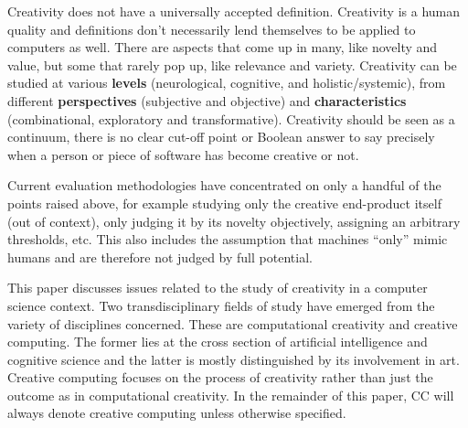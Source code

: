 Creativity does not have a universally accepted definition. Creativity is a human quality and definitions don’t necessarily lend themselves to be applied to computers as well. There are aspects that come up in many, like novelty and value, but some that rarely pop up, like relevance and variety. Creativity can be studied at various \textbf{levels} (neurological, cognitive, and holistic/systemic), from different \textbf{perspectives} (subjective and objective) and \textbf{characteristics} (combinational, exploratory and transformative). Creativity should be seen as a continuum, there is no clear cut-off point or Boolean answer to say precisely when a person or piece of software has become creative or not.

Current evaluation methodologies have concentrated on only a handful of the points raised above, for example studying only the creative end-product itself (out of context), only judging it by its novelty objectively, assigning an arbitrary thresholds, etc. This also includes the assumption that machines ``only'' mimic humans and are therefore not judged by full potential.

\begin{comment}
  What does it mean, how can it be measured?

  Subjectivity vs objectivity is a theme throughout

  How is it defined and measured in humans, what can we just take directly from those concepts and apply them directly to machines and what needs to be completely redefined?
\end{comment}

This paper discusses issues related to the study of creativity in a computer science context. Two transdisciplinary fields of study have emerged from the variety of disciplines concerned. These are computational creativity and creative computing. The former lies at the cross section of artificial intelligence and cognitive science and the latter is mostly distinguished by its involvement in art. Creative computing focuses on the process of creativity rather than just the outcome as in computational creativity. In the remainder of this paper, CC will always denote creative computing unless otherwise specified.

\begin{comment}
  Many of these (if not all) spawn from the computational creativity discipline.

  Introduce the difference between human and computer evaluation/creativity?
\end{comment}

